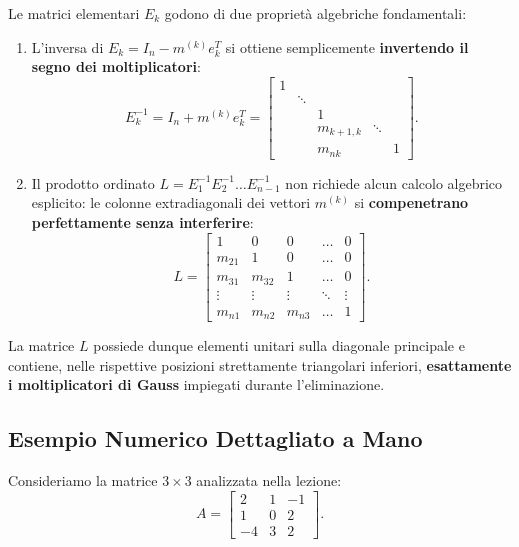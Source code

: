 \begin{property}
Le matrici elementari $E_k$ godono di due propriet\`a algebriche fondamentali:
\begin{enumerate}
    \item L'inversa di $E_k = I_n - m^{(k)} e_k^T$ si ottiene semplicemente \textbf{invertendo il segno dei moltiplicatori}:
    \begin{equation}
        E_k^{-1} = I_n + m^{(k)} e_k^T = \begin{bmatrix}
            1 & & & & \\
            & \ddots & & & \\
            & & 1 & & \\
            & & m_{k+1, k} & \ddots & \\
            & & m_{nk} & & 1
        \end{bmatrix}.
    \end{equation}
    \item Il prodotto ordinato $L = E_1^{-1} E_2^{-1} \dots E_{n-1}^{-1}$ non richiede alcun calcolo algebrico esplicito: le colonne extradiagonali dei vettori $m^{(k)}$ si \textbf{compenetrano perfettamente senza interferire}:
    \begin{equation}
        L = \begin{bmatrix}
            1 & 0 & 0 & \dots & 0 \\
            m_{21} & 1 & 0 & \dots & 0 \\
            m_{31} & m_{32} & 1 & \dots & 0 \\
            \vdots & \vdots & \vdots & \ddots & \vdots \\
            m_{n1} & m_{n2} & m_{n3} & \dots & 1
        \end{bmatrix}.
    \end{equation}
\end{enumerate}
\end{property}
La matrice $L$ possiede dunque elementi unitari sulla diagonale principale e contiene, nelle rispettive posizioni strettamente triangolari inferiori, \textbf{esattamente i moltiplicatori di Gauss} impiegati durante l'eliminazione.

\subsection{Esempio Numerico Dettagliato a Mano}
\label{subsec:esempio-numerico-lu-manuale}
Consideriamo la matrice $3 \times 3$ analizzata nella lezione:
\begin{equation}
    A = \begin{bmatrix}
        2 & 1 & -1 \\
        1 & 0 & 2 \\
        -4 & 3 & 2
    \end{bmatrix}.
\end{equation}

